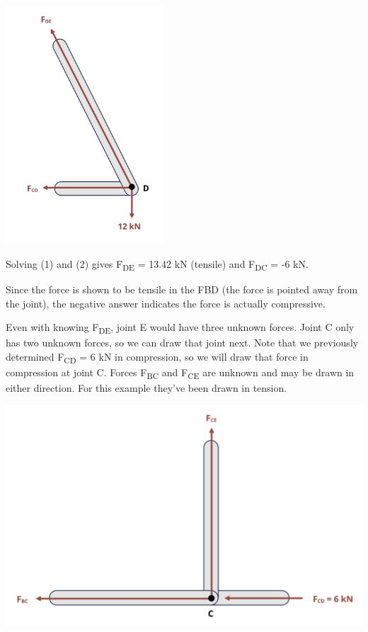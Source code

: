 \documentclass[
  letterpaper,
  DIV=11,
  numbers=noendperiod]{scrreprt}
\begin{document}
\begin{tcolorbox}
\begin{center}
\includegraphics[width=2.3125in,height=\textheight]{images/CH1 PNGs/example 1.4 part 2.png}
\end{center}

Solving (1) and (2) gives F\textsubscript{DE} = 13.42 kN (tensile) and
F\textsubscript{DC} = -6 kN.

Since the force is shown to be tensile in the FBD (the force is pointed
away from the joint), the negative answer indicates the force is
actually compressive.

Even with knowing F\textsubscript{DE}, joint E would have three unknown
forces. Joint C only has two unknown forces, so we can draw that joint
next. Note that we previously determined F\textsubscript{CD} = 6 kN in
compression, so we will draw that force in compression at joint C.
Forces F\textsubscript{BC} and F\textsubscript{CE} are unknown and may
be drawn in either direction. For this example they've been drawn in
tension.

\begin{center}
\includegraphics[width=5.34375in,height=\textheight]{images/CH1 PNGs/example 1.4 part 3.png}
\end{center}


\end{tcolorbox}
\end{document}
